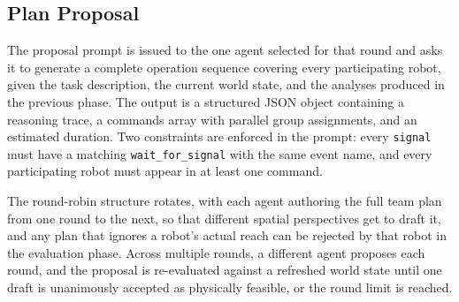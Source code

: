 \documentclass[
     12pt,
     a4paper,
     BCOR=10mm,
     DIV=14,
     listof=totoc,
     bibliography=totoc,
     parskip,
     twoside,
     headsepline
     ]{scrreprt}
\begin{document}
\subsection{Plan Proposal}
The proposal prompt is issued to the one agent selected for that round and asks it to generate a complete operation sequence covering every participating robot, given the task description, the current world state, and the analyses produced in the previous phase. The output is a structured JSON object containing a reasoning trace, a commands array with parallel group assignments, and an estimated duration. Two constraints are enforced in the prompt: every \texttt{signal} must have a matching \texttt{wait\_for\_signal} with the same event name, and every participating robot must appear in at least one command.

The round-robin structure rotates, with each agent authoring the full team plan from one round to the next, so that different spatial perspectives get to draft it, and any plan that ignores a robot's actual reach can be rejected by that robot in the evaluation phase. Across multiple rounds, a different agent proposes each round, and the proposal is re-evaluated against a refreshed world state until one draft is unanimously accepted as physically feasible, or the round limit is reached.
\end{document}
